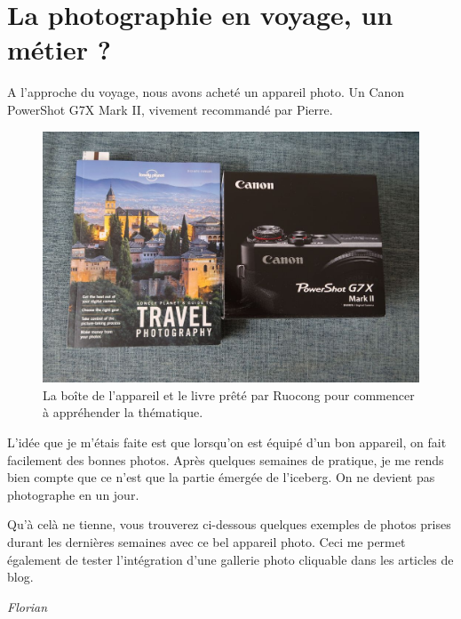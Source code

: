 \hypertarget{la-photographie-en-voyage-un-muxe9tier}{%
\section{La photographie en voyage, un métier
?}\label{la-photographie-en-voyage-un-muxe9tier}}
\emph{}
A l'approche du voyage, nous avons acheté un appareil photo. Un Canon
PowerShot G7X Mark II, vivement recommandé par Pierre.

\begin{figure}
\centering
\includegraphics{images/appareil_photo_canon_g7x.JPG}
\caption{La boîte de l'appareil et le livre prêté par Ruocong pour
commencer à appréhender la thématique.}
\end{figure}

L'idée que je m'étais faite est que lorsqu'on est équipé d'un bon
appareil, on fait facilement des bonnes photos. Après quelques semaines
de pratique, je me rends bien compte que ce n'est que la partie émergée
de l'iceberg. On ne devient pas photographe en un jour.

Qu'à celà ne tienne, vous trouverez ci-dessous quelques exemples de
photos prises durant les dernières semaines avec ce bel appareil photo.
Ceci me permet également de tester l'intégration d'une gallerie photo
cliquable dans les articles de blog.

\emph{Florian}
